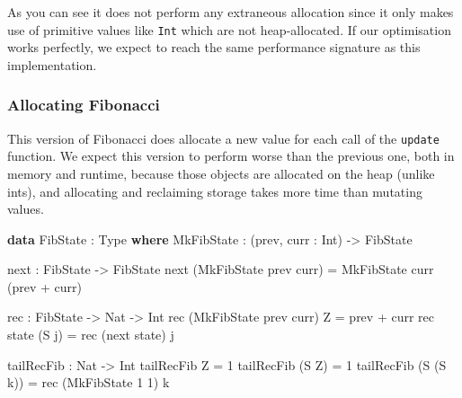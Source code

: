 \documentclass[
]{article}
\newenvironment{Shaded}{}{}
\newcommand{\DataTypeTok}[1]{\textcolor[rgb]{0.56,0.13,0.00}{#1}}
\newcommand{\DecValTok}[1]{\textcolor[rgb]{0.25,0.63,0.44}{#1}}
\newcommand{\KeywordTok}[1]{\textcolor[rgb]{0.00,0.44,0.13}{\textbf{#1}}}
\newcommand{\NormalTok}[1]{#1}
\newcommand{\OperatorTok}[1]{\textcolor[rgb]{0.40,0.40,0.40}{#1}}
\newcommand{\OtherTok}[1]{\textcolor[rgb]{0.00,0.44,0.13}{#1}}
\begin{document}
As you can see it does not perform any extraneous allocation since it
only makes use of primitive values like \texttt{Int} which are not
heap-allocated. If our optimisation works perfectly, we expect to reach
the same performance signature as this implementation.

\hypertarget{allocating-fibonacci}{%
\subsubsection{Allocating Fibonacci}\label{allocating-fibonacci}}

This version of Fibonacci does allocate a new value for each call of the
\texttt{update} function. We expect this version to perform worse than
the previous one, both in memory and runtime, because those objects are
allocated on the heap (unlike ints), and allocating and reclaiming
storage takes more time than mutating values.

\begin{Shaded}
\begin{Highlighting}[]
\KeywordTok{data} \DataTypeTok{FibState} \OperatorTok{:} \DataTypeTok{Type} \KeywordTok{where}
  \DataTypeTok{MkFibState} \OperatorTok{:}\NormalTok{ (prev, curr }\OperatorTok{:}  \DataTypeTok{Int}\NormalTok{) }\OtherTok{{-}\textgreater{}} \DataTypeTok{FibState}

\NormalTok{next }\OperatorTok{:} \DataTypeTok{FibState} \OtherTok{{-}\textgreater{}} \DataTypeTok{FibState}
\NormalTok{next (}\DataTypeTok{MkFibState}\NormalTok{ prev curr) }\OtherTok{=} \DataTypeTok{MkFibState}\NormalTok{ curr (prev }\OperatorTok{+}\NormalTok{ curr)}

\NormalTok{rec }\OperatorTok{:} \DataTypeTok{FibState} \OtherTok{{-}\textgreater{}} \DataTypeTok{Nat} \OtherTok{{-}\textgreater{}} \DataTypeTok{Int}
\NormalTok{rec (}\DataTypeTok{MkFibState}\NormalTok{ prev curr) }\DataTypeTok{Z} \OtherTok{=}\NormalTok{ prev }\OperatorTok{+}\NormalTok{ curr}
\NormalTok{rec state (}\DataTypeTok{S}\NormalTok{ j) }\OtherTok{=}\NormalTok{ rec (next state) j}

\NormalTok{tailRecFib }\OperatorTok{:} \DataTypeTok{Nat} \OtherTok{{-}\textgreater{}} \DataTypeTok{Int}
\NormalTok{tailRecFib }\DataTypeTok{Z} \OtherTok{=} \DecValTok{1}
\NormalTok{tailRecFib (}\DataTypeTok{S} \DataTypeTok{Z}\NormalTok{) }\OtherTok{=} \DecValTok{1}
\NormalTok{tailRecFib (}\DataTypeTok{S}\NormalTok{ (}\DataTypeTok{S}\NormalTok{ k)) }\OtherTok{=}\NormalTok{ rec (}\DataTypeTok{MkFibState} \DecValTok{1} \DecValTok{1}\NormalTok{) k}
\end{Highlighting}
\end{Shaded}
\end{document}
